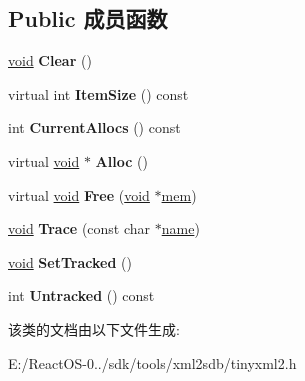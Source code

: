 \subsection*{Public 成员函数}
\begin{DoxyCompactItemize}
\item 
\mbox{\label{classtinyxml2_1_1_mem_pool_t_a469d55e82be97d5ffeff82dd001a7029}} 
\hyperlink{interfacevoid}{void} {\bfseries Clear} ()
\item 
\mbox{\label{classtinyxml2_1_1_mem_pool_t_a0d808a013738c549fe675e0c125bcad8}} 
virtual int {\bfseries Item\+Size} () const
\item 
\mbox{\label{classtinyxml2_1_1_mem_pool_t_acafff0b90381d30902bbae54eb1c0b28}} 
int {\bfseries Current\+Allocs} () const
\item 
\mbox{\label{classtinyxml2_1_1_mem_pool_t_aa9d785a48ffe6ea1be679bab13464486}} 
virtual \hyperlink{interfacevoid}{void} $\ast$ {\bfseries Alloc} ()
\item 
\mbox{\label{classtinyxml2_1_1_mem_pool_t_a4f1a0c434e9e3d7391e5c16ed4ee8c70}} 
virtual \hyperlink{interfacevoid}{void} {\bfseries Free} (\hyperlink{interfacevoid}{void} $\ast$\hyperlink{structmem}{mem})
\item 
\mbox{\label{classtinyxml2_1_1_mem_pool_t_a0bc596f271e0f139822c534238b3f244}} 
\hyperlink{interfacevoid}{void} {\bfseries Trace} (const char $\ast$\hyperlink{structname}{name})
\item 
\mbox{\label{classtinyxml2_1_1_mem_pool_t_a7798932414916199a1bc0f9c3f368521}} 
\hyperlink{interfacevoid}{void} {\bfseries Set\+Tracked} ()
\item 
\mbox{\label{classtinyxml2_1_1_mem_pool_t_a365d95526f22abe08e306d63e30c0b51}} 
int {\bfseries Untracked} () const
\end{DoxyCompactItemize}


该类的文档由以下文件生成\+:\begin{DoxyCompactItemize}
\item 
E\+:/\+React\+O\+S-\/0../sdk/tools/xml2sdb/tinyxml2.\+h\end{DoxyCompactItemize}
